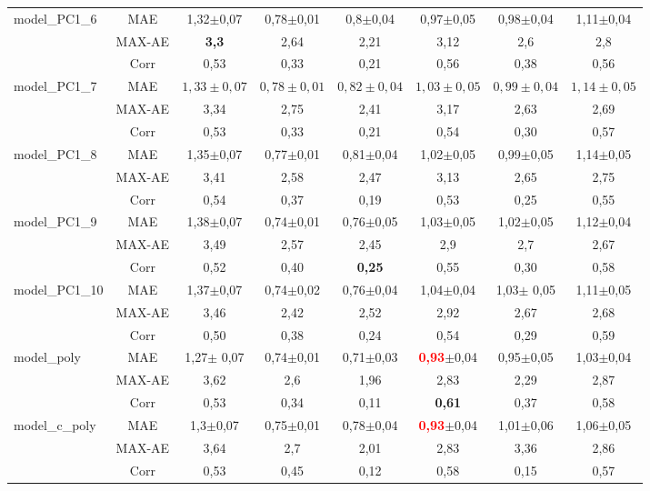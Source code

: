 \begin{table}[h!]
\begin{center}
\begin{tabular}{lc||c|c|c|c|c|c}
			\hline
			model\_PC1\_6&MAE & 1,32$\pm$0,07 & 0,78$\pm$0,01 &0,8$\pm$0,04& 0,97$\pm$0,05 & 0,98$\pm$0,04 &1,11$\pm$0,04\\
			&MAX-AE &\textbf{3,3}&2,64&2,21&3,12&2,6&2,8\\
			&Corr &0,53&0,33&0,21&0,56&0,38&0,56\\
			
			\hline
			model\_PC1\_7&MAE &$1,33\pm{0,07}$&$0,78\pm{0,01}$&$0,82\pm{0,04}$&$1,03\pm{0,05}$&$0,99\pm{0,04}$&$1,14\pm{0,05}$\\
			&MAX-AE &3,34&2,75&2,41&3,17&2,63&2,69\\
			&Corr &0,53&0,33&0,21&0,54&0,30&0,57\\
			
			\hline
			model\_PC1\_8&MAE & 1,35$\pm$0,07 & 0,77$\pm$0,01& 0,81$\pm$0,04&1,02$\pm$0,05& 0,99$\pm$0,05 & 1,14$\pm$0,05\\
			&MAX-AE &3,41&2,58&2,47&3,13&2,65&2,75\\
			&Corr &0,54&0,37&0,19&0,53&0,25&0,55\\
			
			\hline
			model\_PC1\_9&MAE & 1,38$\pm$0,07 & 0,74$\pm$0,01 & 0,76$\pm$0,05 & 1,03$\pm$0,05 & 1,02$\pm$0,05 & 1,12$\pm$0,04\\
			&MAX-AE &3,49&2,57&2,45&2,9&2,7&2,67\\
			&Corr &0,52&0,40&\textbf{0,25}&0,55&0,30&0,58\\
			
			\hline
			model\_PC1\_10&MAE & 1,37$\pm$0,07 & 0,74$\pm$0,02 & 0,76$\pm$0,04 & 1,04$\pm$0,04 & 1,03$\pm$ 0,05& 1,11$\pm$0,05\\
			&MAX-AE &3,46&2,42&2,52&2,92&2,67&2,68\\
			&Corr &0,50&0,38&0,24&0,54&0,29&0,59\\
			
			\hline
			model\_poly&MAE & 1,27$\pm$ 0,07 & 0,74$\pm$0,01 & 0,71$\pm$0,03 & \textcolor{red}{\textbf{0,93}}$\pm$0,04 & 0,95$\pm$0,05 & 1,03$\pm$0,04\\
			&MAX-AE &3,62&2,6&1,96&2,83&2,29&2,87\\
			&Corr &0,53&0,34&0,11&\textbf{0,61}&0,37&0,58\\
			
			\hline
			model\_c\_poly&MAE & 1,3$\pm$0,07 & 0,75$\pm$0,01 & 0,78$\pm$0,04 & \textcolor{red}{\textbf{0,93}}$\pm$0,04 & 1,01$\pm$0,06 & 1,06$\pm$0,05 \\
			&MAX-AE &3,64&2,7&2,01&2,83&3,36&2,86\\
			&Corr &0,53&0,45&0,12&0,58&0,15&0,57\\
			\hline 
			

\end{tabular}
\end{center}
\end{table}
